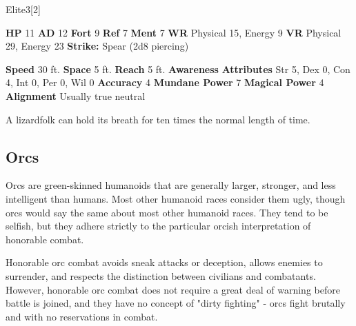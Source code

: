   \begin{monsubsection}{Elite}{3}[2]
    \vspace{-1em}\vspace{-1em}
    \vspace{0em}

    
    

    \begin{spellcontent}
      \begin{spelltargetinginfo}
        \pari \textbf{HP} 11 \monsep
          \textbf{AD} 12 \monsep
          \textbf{Fort} 9 \monsep
          \textbf{Ref} 7 \monsep
          \textbf{Ment} 7
        \pari \textbf{WR} Physical 15, Energy 9 \monsep
        \textbf{VR} Physical 29, Energy 23
        \pari \textbf{Strike:}
            Spear  (2d8 piercing)
      \end{spelltargetinginfo}
    \end{spellcontent}
    \begin{monsterfooter}
      \pari \textbf{Speed} 30 ft. \monsep
        \textbf{Space} 5 ft. \monsep
        \textbf{Reach} 5 ft.
      \pari \textbf{Awareness} 
      \pari \textbf{Attributes}
        Str 5, Dex 0,
        Con 4, Int 0,
        Per 0, Wil 0
      \pari \textbf{Accuracy} 4 \monsep
        \textbf{Mundane Power} 7 \monsep
      \textbf{Magical Power} 4
      \pari \textbf{Alignment} Usually true neutral
    \end{monsterfooter}
  \end{monsubsection}
   A lizardfolk can hold its breath for ten times the normal length of time.
  
  
    \subsection{Orcs}
      
      Orcs are green-skinned humanoids that are generally larger, stronger, and less intelligent than humans.
      Most other humanoid races consider them ugly, though orcs would say the same about most other humanoid races.
      They tend to be selfish, but they adhere strictly to the particular orcish interpretation of honorable combat.
    
      Honorable orc combat avoids sneak attacks or deception, allows enemies to surrender, and respects the distinction between civilians and combatants.
      However, honorable orc combat does not require a great deal of warning before battle is joined, and they have no concept of "dirty fighting" - orcs fight brutally and with no reservations in combat.

